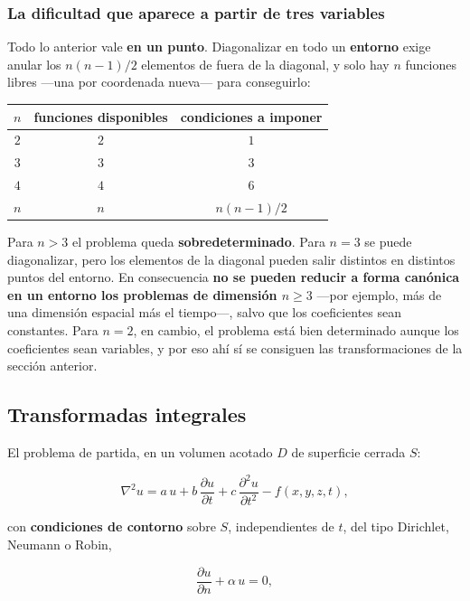\documentclass[
  spanish,
  a4paper,
]{scrbook}
\newcounter{none} %
\theoremstyle{definition}
\theoremstyle{plain}
\theoremstyle{definition}
\theoremstyle{plain}
\theoremstyle{definition}
\theoremstyle{remark}
\begin{document}
\subsubsection{La dificultad que aparece a partir de tres
variables}\label{la-dificultad-que-aparece-a-partir-de-tres-variables}

Todo lo anterior vale \textbf{en un punto}. Diagonalizar en todo un
\textbf{entorno} exige anular los \(n(n-1)/2\) elementos de fuera de la
diagonal, y solo hay \(n\) funciones libres ---una por coordenada
nueva--- para conseguirlo:

{\def\LTcaptype{none} %
\begin{longtable}[]{@{}ccc@{}}
\toprule\noalign{}
\(n\) & funciones disponibles & condiciones a imponer \\
\midrule\noalign{}
\endhead
\bottomrule\noalign{}
\endlastfoot
\(2\) & \(2\) & \(1\) \\
\(3\) & \(3\) & \(3\) \\
\(4\) & \(4\) & \(6\) \\
\(n\) & \(n\) & \(n(n-1)/2\) \\
\end{longtable}
}

Para \(n > 3\) el problema queda \textbf{sobredeterminado}. Para \(n=3\)
se puede diagonalizar, pero los elementos de la diagonal pueden salir
distintos en distintos puntos del entorno. En consecuencia \textbf{no se
pueden reducir a forma canónica en un entorno los problemas de dimensión
\(n\ge3\)} ---por ejemplo, más de una dimensión espacial más el
tiempo---, salvo que los coeficientes sean constantes. Para \(n=2\), en
cambio, el problema está bien determinado aunque los coeficientes sean
variables, y por eso ahí sí se consiguen las transformaciones de la
sección anterior.

\subsection{Transformadas integrales}\label{sec-resumen-7}

El problema de partida, en un volumen acotado \(D\) de superficie
cerrada \(S\):

\[
\nabla^2 u = a\,u + b\,\frac{\partial u}{\partial t} + c\,\frac{\partial^2 u}{\partial t^2} - f(x,y,z,t) ,
\]

con \textbf{condiciones de contorno} sobre \(S\), independientes de
\(t\), del tipo Dirichlet, Neumann o Robin,

\[
\frac{\partial u}{\partial n} + \alpha\,u = 0 ,
\]
\end{document}
